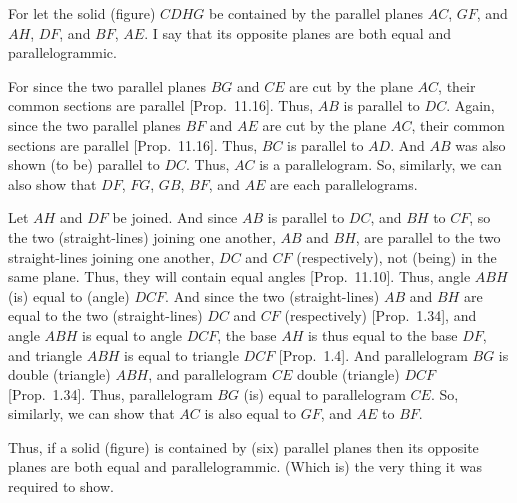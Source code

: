 \begin{Parallel}{}{}
{For let the solid (figure) $CDHG$ be contained by the parallel planes
$AC$, $GF$, and $AH$, $DF$, and $BF$, $AE$. I say that its opposite
planes are both equal and parallelogrammic.

For since the two parallel planes $BG$ and $CE$ are cut by the plane
$AC$, their common sections are parallel [Prop.~11.16]. Thus, $AB$ is parallel to $DC$.  Again, since
the two parallel planes $BF$ and $AE$ are cut by the plane
$AC$, their common sections are parallel [Prop.~11.16]. Thus,  $BC$ is parallel to $AD$. And
$AB$ was also shown (to be) parallel to $DC$. Thus, $AC$ is a parallelogram. So, similarly, we can also show that $DF$, $FG$, $GB$,
$BF$, and $AE$ are each parallelograms.

Let $AH$ and $DF$ be joined. And since $AB$ is parallel to
$DC$, and $BH$ to $CF$, so the two (straight-lines) joining one another,
$AB$ and $BH$,
are parallel to the two straight-lines joining one another, $DC$ and
$CF$ (respectively), not (being) in the same plane. Thus, they
will contain equal angles [Prop.~11.10]. Thus,
angle $ABH$ (is) equal to (angle) $DCF$. And since the two (straight-lines)
$AB$ and $BH$ are equal to the two (straight-lines) $DC$ and $CF$ (respectively) [Prop.~1.34], and angle $ABH$ is equal to angle $DCF$, the base
$AH$ is thus equal to the base $DF$, and triangle $ABH$ is equal to
triangle $DCF$ [Prop.~1.4]. And parallelogram
$BG$ is double (triangle) $ABH$, and parallelogram $CE$
double (triangle) $DCF$ [Prop.~1.34]. Thus,
parallelogram $BG$ (is) equal to parallelogram $CE$. So, similarly,
we can show that $AC$ is also equal to $GF$, and $AE$ to $BF$.

Thus, if a solid (figure) is contained by (six) parallel planes then its opposite planes
are both equal and parallelogrammic. (Which is) the very thing it was required to
show.}
\end{Parallel}

